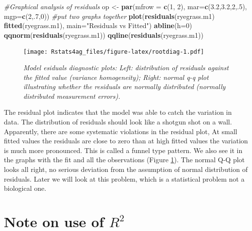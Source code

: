 \documentclass[letterpaper,]{book}
\newenvironment{Shaded}{\begin{snugshade}}{\end{snugshade}}
\newcommand{\CommentTok}[1]{\textcolor[rgb]{0.56,0.35,0.01}{\textit{#1}}}
\newcommand{\DataTypeTok}[1]{\textcolor[rgb]{0.13,0.29,0.53}{#1}}
\newcommand{\DecValTok}[1]{\textcolor[rgb]{0.00,0.00,0.81}{#1}}
\newcommand{\FloatTok}[1]{\textcolor[rgb]{0.00,0.00,0.81}{#1}}
\newcommand{\KeywordTok}[1]{\textcolor[rgb]{0.13,0.29,0.53}{\textbf{#1}}}
\newcommand{\NormalTok}[1]{#1}
\newcommand{\OperatorTok}[1]{\textcolor[rgb]{0.81,0.36,0.00}{\textbf{#1}}}
\newcommand{\StringTok}[1]{\textcolor[rgb]{0.31,0.60,0.02}{#1}}
\begin{document}
\begin{Shaded}
\begin{Highlighting}[]
\CommentTok{#Graphical analysis of residuals}
\NormalTok{op <-}\StringTok{ }\KeywordTok{par}\NormalTok{(}\DataTypeTok{mfrow =} \KeywordTok{c}\NormalTok{(}\DecValTok{1}\NormalTok{, }\DecValTok{2}\NormalTok{), }\DataTypeTok{mar=}\KeywordTok{c}\NormalTok{(}\FloatTok{3.2}\NormalTok{,}\FloatTok{3.2}\NormalTok{,}\DecValTok{2}\NormalTok{,.}\DecValTok{5}\NormalTok{), }\DataTypeTok{mgp=}\KeywordTok{c}\NormalTok{(}\DecValTok{2}\NormalTok{,.}\DecValTok{7}\NormalTok{,}\DecValTok{0}\NormalTok{)) }\CommentTok{#put two graphs together}
    \KeywordTok{plot}\NormalTok{(}\KeywordTok{residuals}\NormalTok{(ryegrass.m1) }\OperatorTok{~}\StringTok{ }\KeywordTok{fitted}\NormalTok{(ryegrass.m1), }\DataTypeTok{main=}\StringTok{"Residuals vs Fitted"}\NormalTok{)}
\KeywordTok{abline}\NormalTok{(}\DataTypeTok{h=}\DecValTok{0}\NormalTok{)}
\KeywordTok{qqnorm}\NormalTok{(}\KeywordTok{residuals}\NormalTok{(ryegrass.m1))}
 \KeywordTok{qqline}\NormalTok{(}\KeywordTok{residuals}\NormalTok{(ryegrass.m1))}
\end{Highlighting}
\end{Shaded}

\begin{figure}
\centering
\texttt{[image: Rstats4ag\_files/figure-latex/rootdiag-1.pdf]}
\caption{\label{fig:rootdiag}\emph{Model esiduals diagnostic plots: Left: distribution of residuals against the fitted value (variance homogeneity); Right: normal q-q plot illustrating whether the residuals are normally distributed (normally distributed measurement errors).}}
\end{figure}

The residual plot indicates that the model was able to catch the variation in data. The distribution of residuals should look like a shotgun shot on a wall. Apparently, there are some systematic violations in the residual plot, At small fitted values the residuals are close to zero than at high fitted values the variation is much more pronounced. This is called a funnel type pattern. We also see it in the graphs with the fit and all the observations (Figure \ref{fig:rootdiag}). The normal Q-Q plot looks all right, no serious deviation from the assumption of normal distribution of residuals. Later we will look at this problem, which is a statistical problem not a biological one.

\hypertarget{note-on-use-of-r2}{%
\section{\texorpdfstring{Note on use of \(R^2\)}{Note on use of R\^{}2}}\label{note-on-use-of-r2}}
\end{document}
